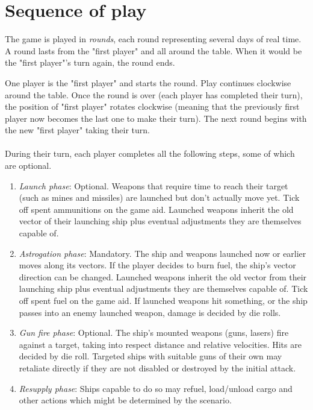\documentclass[a4paper,12pt,notitlepage,twocolumn]{article}
\begin{document}
\section{Sequence of play}
\label{sec:sequence_of_play}
The game is played in \emph{rounds}, each round representing several days of 
real time. A round lasts from the "first player" and all around the table. When it 
would be the "first player"'s turn again, the round ends. 

One player is the "first player" and starts the round. Play continues
clockwise around the table. Once the round is over
(each player has completed their turn), the position of "first player" rotates
clockwise (meaning that the previously first player now becomes the last 
one to make their turn). The next round begins with the new "first player" taking
their turn. 
\\\\
During their turn, each player completes all the following steps, some
of which are optional. 
\begin{enumerate}
\item \emph{Launch phase}: Optional. Weapons that require time to reach their
  target (such as mines and missiles) are launched but don't actually move yet. Tick off 
  spent ammunitions on the game aid. Launched weapons inherit the old 
  vector of their launching ship plus eventual adjustments
  they are themselves capable of.  
\item \emph{Astrogation phase}: Mandatory. The ship and weapons launched now or earlier moves along its vectors. 
  If the player decides to burn fuel, the ship's vector direction can be changed. Launched weapons inherit the old vector
  from their launching ship plus eventual adjustments they are themselves capable of. 
  Tick off spent fuel on the game aid. If launched weapons hit something, or the ship passes into an
  enemy launched weapon, damage is decided by die rolls.
\item \emph{Gun fire phase}: Optional. The ship's mounted weapons (guns, lasers)
  fire against a target, taking into respect distance and
  relative velocities. Hits are decided by die roll. Targeted ships with suitable
  guns of their own may retaliate directly if they are not disabled or destroyed 
  by the initial attack.
\item \emph{Resupply phase}: Ships capable to do so may refuel,
  load/unload cargo and other actions which might be determined by the
  scenario.
\end{enumerate}
\end{document}

